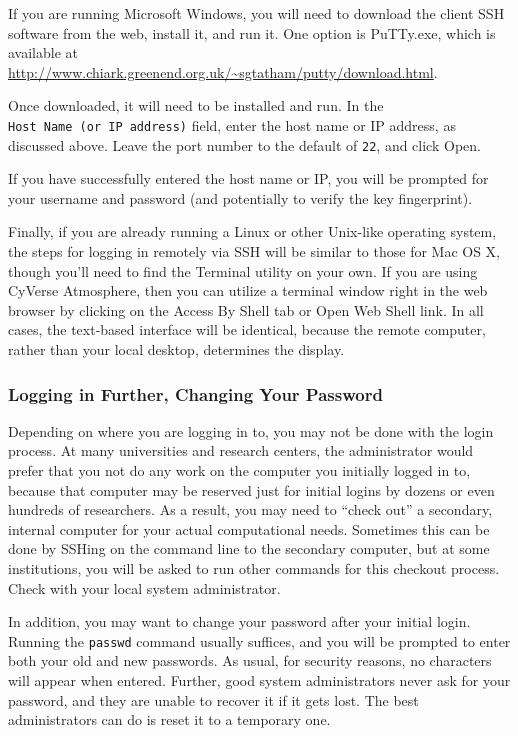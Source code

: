 \documentclass[
]{memoir}
\begin{document}
If you are running Microsoft Windows, you will need to download the client SSH software from the web, install it, and run it. One option is PuTTy.exe, which is available at \url{http://www.chiark.greenend.org.uk/~sgtatham/putty/download.html}.

Once downloaded, it will need to be installed and run. In the \texttt{Host\ Name\ (or\ IP\ address)} field, enter the host name or IP address, as discussed above. Leave the port number to the default of \texttt{22}, and click Open.

If you have successfully entered the host name or IP, you will be prompted for your username and password (and potentially to verify the key fingerprint).

Finally, if you are already running a Linux or other Unix-like operating system, the steps for logging in remotely via SSH will be similar to those for Mac OS X, though you'll need to find the Terminal utility on your own. If you are using CyVerse Atmosphere, then you can utilize a terminal window right in the web browser by clicking on the Access By Shell tab or Open Web Shell link. In all cases, the text-based interface will be identical, because the remote computer, rather than your local desktop, determines the display.

\hypertarget{logging-in-further-changing-your-password}{%
\subsubsection*{Logging in Further, Changing Your Password}\label{logging-in-further-changing-your-password}}

Depending on where you are logging in to, you may not be done with the login process. At many universities and research centers, the administrator would prefer that you not do any work on the computer you initially logged in to, because that computer may be reserved just for initial logins by dozens or even hundreds of researchers. As a result, you may need to \enquote{check out} a secondary, internal computer for your actual computational needs. Sometimes this can be done by SSHing on the command line to the secondary computer, but at some institutions, you will be asked to run other commands for this checkout process. Check with your local system administrator.

In addition, you may want to change your password after your initial login. Running the \texttt{passwd} command usually suffices, and you will be prompted to enter both your old and new passwords. As usual, for security reasons, no characters will appear when entered. Further, good system administrators never ask for your password, and they are unable to recover it if it gets lost. The best administrators can do is reset it to a temporary one.
\end{document}
